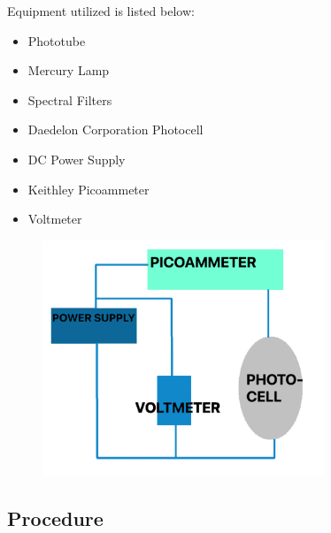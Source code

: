 \documentclass[a4paper]{article}
\begin{document}
Equipment utilized is listed below:

\begin{itemize}
\item Phototube 
\item Mercury Lamp 
\item Spectral Filters 
\item Daedelon Corporation Photocell 
\item DC Power Supply 
\item Keithley Picoammeter 
\item Voltmeter 
\end{itemize}

\begin{figure}[H]
\centering
\includegraphics[width=0.75\textwidth]{photo_circuit.png}
\label{photo_circuit}
\end{figure}

\subsection{Procedure}

\end{document}
